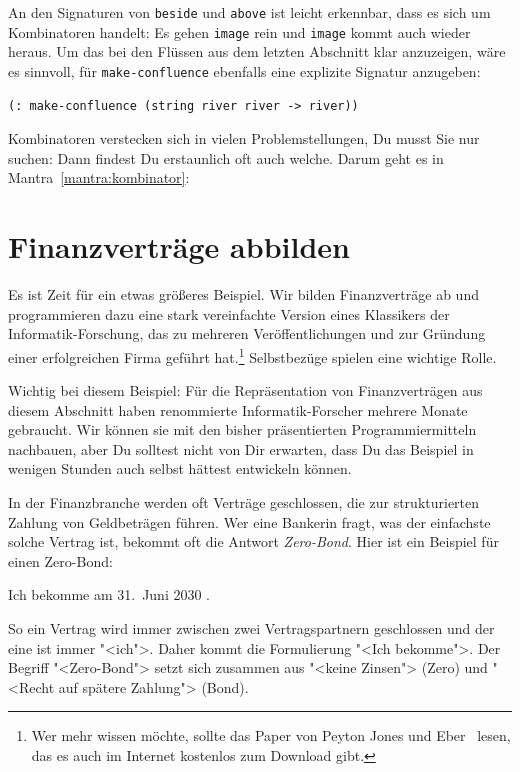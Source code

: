 An den Signaturen von \lstinline{beside} und \lstinline{above} ist
leicht erkennbar, dass es sich um Kombinatoren handelt: Es gehen
\lstinline{image} rein und \lstinline{image} kommt auch wieder
heraus.  Um das bei den Flüssen aus dem letzten Abschnitt klar
anzuzeigen, wäre es sinnvoll, für \lstinline{make-confluence}
ebenfalls eine explizite Signatur anzugeben:
%
\begin{lstlisting}
(: make-confluence (string river river -> river))
\end{lstlisting}
%
Kombinatoren verstecken sich in vielen Problemstellungen, Du musst Sie
nur suchen: Dann findest Du erstaunlich oft auch welche.  Darum geht
es in Mantra~\ref{mantra:kombinator}:

\mantrakombinator*

\section{Finanzverträge abbilden}
\label{sec:financial-contracts}

Es ist Zeit für ein etwas größeres Beispiel.  Wir bilden
Finanzverträge ab und programmieren dazu eine stark vereinfachte
Version eines Klassikers der Informatik-Forschung, das zu mehreren
Veröffentlichungen und zur Gründung einer erfolgreichen Firma geführt
hat.\footnote{Wer mehr wissen möchte, sollte das Paper von Peyton
  Jones und Eber~\cite{FinancialContracts} lesen, das es auch im
  Internet kostenlos zum Download gibt.}  Selbstbezüge spielen eine wichtige
Rolle.

Wichtig bei diesem Beispiel: Für die Repräsentation von
Finanzverträgen aus diesem Abschnitt haben renommierte
Informatik-Forscher mehrere Monate gebraucht.  Wir können sie mit den
bisher präsentierten Programmiermitteln nachbauen, aber Du solltest
nicht von Dir erwarten, dass Du das Beispiel in wenigen Stunden auch
selbst hättest entwickeln können.

In der Finanzbranche werden oft Verträge geschlossen, die zur
strukturierten Zahlung von Geldbeträgen führen.  Wer eine Bankerin
fragt, was der einfachste solche Vertrag ist, bekommt oft die Antwort
\textit{Zero-Bond}.  Hier ist ein Beispiel für einen Zero-Bond:
%
\begin{center}
  Ich bekomme am 31.\ Juni 2030 .
\end{center}
%
So ein Vertrag wird immer zwischen zwei Vertragspartnern geschlossen und der
eine ist immer "<ich">.  Daher kommt die Formulierung "<Ich
bekomme">.  Der Begriff "<Zero-Bond"> setzt sich zusammen aus "<keine
Zinsen"> (Zero) und "<Recht auf spätere Zahlung"> (Bond).

